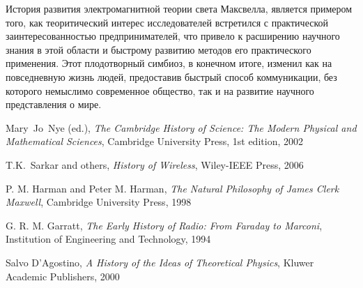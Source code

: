 \documentclass[12pt, oneside, a4paper]{article}
\begin{document}
История развития электромагнитной теории света Максвелла, является примером того, как теоритический интерес исследователей встретился с практической заинтересованностью предпринимателей, что привело  к расширению  научного знания в этой области и быстрому развитию методов его практического применения. Этот плодотворный симбиоз, в конечном итоге, изменил как на повседневную жизнь людей, предоставив быстрый способ коммуникации, без которого немыслимо современное общество, так и на развитие научного представления о мире.  
\clearpage
{} 
\begin{thebibliography}{9}
 Mary~Jo~Nye (ed.), \emph{The Cambridge History of Science: The Modern Physical and Mathematical Sciences}, Cambridge University Press, 1st edition, 2002

 T.K.~Sarkar and others, \emph{History of Wireless}, Wiley-IEEE Press, 2006

 P. M. Harman and Peter M. Harman, \emph{The Natural Philosophy of James Clerk Maxwell},  Cambridge University Press, 1998

G. R. M. Garratt, \emph{The Early History of Radio: From Faraday to Marconi},  Institution of Engineering and Technology, 1994

Salvo D'Agostino, \emph{A History of the Ideas of Theoretical Physics}, Kluwer Academic Publishers, 2000 

\end{thebibliography}
\end{document}
